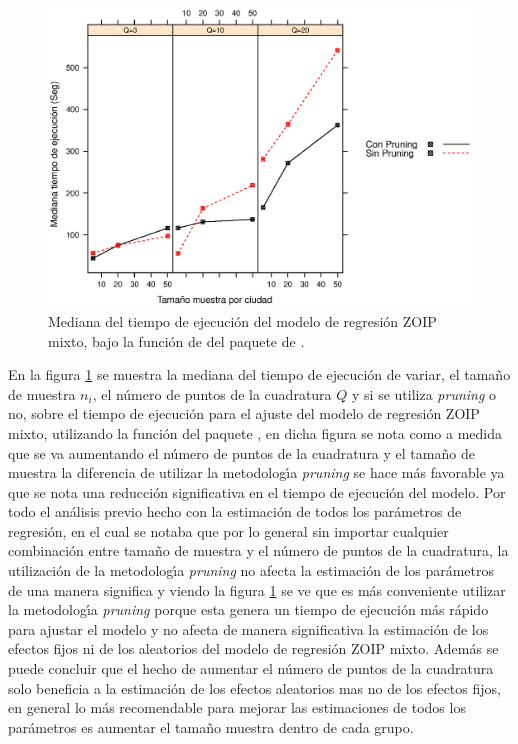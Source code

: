 \begin{figure}
	\begin{center}
		\includegraphics[scale=0.6]{time_mix_ZOIP.eps}	
		\caption{Mediana del tiempo de ejecuci\'{o}n del modelo de regresi\'{o}n ZOIP mixto, bajo la funci\'{o}n de  del paquete  de .}
		\label{time_mix_ZOIP}
	\end{center}
\end{figure}

En la figura \ref{time_mix_ZOIP} se muestra la mediana del tiempo de ejecuci\'{o}n de variar, el tama\~{n}o de muestra $n_i$, el n\'{u}mero de puntos de la cuadratura $Q$ y si se utiliza \textit{pruning} o no, sobre el tiempo de ejecuci\'{o}n para el ajuste del modelo de regresi\'{o}n ZOIP mixto, utilizando la funci\'{o}n  del paquete , en dicha figura se nota como a medida que se va aumentando el n\'{u}mero de puntos de la cuadratura y el tama\~{n}o de muestra la diferencia de utilizar la metodolog\'{\i}a \textit{pruning} se hace m\'{a}s favorable ya que se nota una reducci\'{o}n significativa en el tiempo de ejecuci\'{o}n del modelo. Por todo el an\'{a}lisis previo hecho con la estimaci\'{o}n de todos los par\'{a}metros de regresi\'{o}n, en el cual se notaba que por lo general sin importar cualquier combinaci\'{o}n entre tama\~{n}o de muestra y el n\'{u}mero de puntos de la cuadratura, la utilizaci\'{o}n de la metodolog\'{\i}a \textit{pruning} no afecta la estimaci\'{o}n de los par\'{a}metros de una manera significa y viendo la figura \ref{time_mix_ZOIP} se ve que es m\'{a}s conveniente utilizar la metodolog\'{\i}a \textit{pruning} porque esta genera un tiempo de ejecuci\'{o}n m\'{a}s r\'{a}pido para ajustar el modelo y no afecta de manera significativa la estimaci\'{o}n de los efectos fijos ni de los aleatorios del modelo de regresi\'{o}n ZOIP mixto. Adem\'{a}s se puede concluir que el hecho de aumentar el n\'{u}mero de puntos de la cuadratura solo beneficia a la estimaci\'{o}n de los efectos aleatorios mas no de los efectos fijos, en general lo m\'{a}s recomendable para mejorar las estimaciones de todos los par\'{a}metros es aumentar el tama\~{n}o muestra dentro de cada grupo.


